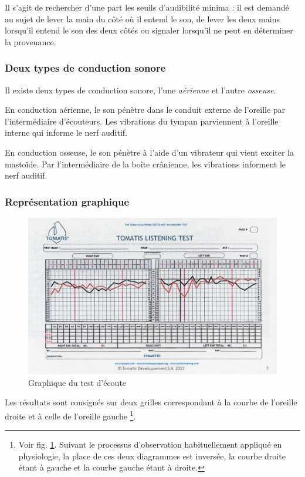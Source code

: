 Il s'agit de rechercher d'une part les seuils d'audibilité
minima : il est demandé au sujet de lever la main du côté
où il entend le son, de lever les deux mains lorsqu'il entend le son
des deux côtés ou signaler lorsqu'il ne peut en déterminer la provenance.

\subsubsection{Deux types de conduction sonore}
Il existe deux types de conduction sonore, l'une \emph{aérienne} et l'autre \emph{osseuse}.

En conduction aérienne, le son pénètre dans le conduit externe de
l'oreille par l'intermédiaire d'écouteurs. Les vibrations du tympan
parviennent à l'oreille interne qui informe le nerf auditif.

En conduction osseuse, le son pénètre à l'aide d'un
vibrateur qui vient exciter la mastoïde. Par l'intermédiaire de la
boîte crânienne, les vibrations informent le nerf auditif.

\subsubsection{Représentation graphique}

\begin{figure}
	\centering
	\includegraphics[width=0.7\linewidth]{images/tomatisListeningTest.jpg}
	\caption[Graphique du test d'écoute]{Graphique du test d'écoute}
	\label{fig:tomatislisteningtest}
\end{figure}

Les résultats sont consignés sur deux grilles correspondant à la courbe
de l'oreille droite et à celle de l'oreille gauche%
\footnote{Voir fig. \ref{fig:tomatislisteningtest}. Suivant le processus d'observation habituellement appliqué en physiologie,
la place de ces deux diagrammes est inversée, la courbe droite étant
à gauche et la courbe gauche étant à droite.}.

